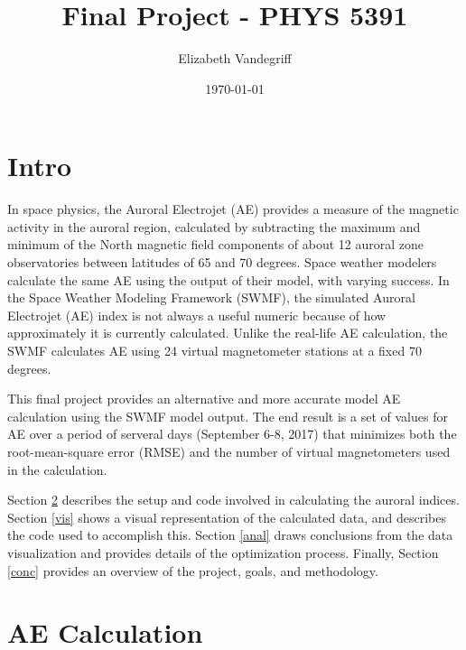 \documentclass[12pt, letterpaper]{article}
\begin{document}
\title{Final Project - PHYS 5391}
\author{Elizabeth Vandegriff}
\date{\today}

\maketitle
\newpage
\tableofcontents
\newpage

\section{Intro} \label{intro}

In space physics, the Auroral Electrojet (AE) provides a measure of the magnetic activity in the auroral region, calculated by subtracting the maximum and minimum of the North magnetic field components of about 12 auroral zone observatories between latitudes of 65 and 70 degrees. Space weather modelers calculate the same AE using the output of their model, with varying success. In the Space Weather Modeling Framework (SWMF), the simulated Auroral Electrojet (AE) index is not always a useful numeric because of how approximately it is currently calculated. Unlike the real-life AE calculation, the SWMF calculates AE using 24 virtual magnetometer stations at a fixed 70 degrees.

This final project provides an alternative and more accurate model AE calculation using the SWMF model output. The end result is a set of values for AE over a period of serveral days (September 6-8, 2017) that minimizes both the root-mean-square error (RMSE) and the number of virtual magnetometers used in the calculation.

Section \ref{calc} describes the setup and code involved in calculating the auroral indices. Section \ref{vis} shows a visual representation of the calculated data, and describes the code used to accomplish this. Section \ref{anal} draws conclusions from the data visualization and provides details of the optimization process. Finally, Section \ref{conc} provides an overview of the project, goals, and methodology.


\section{AE Calculation} \label{calc}
\end{document}

